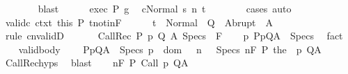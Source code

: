 \begin{isabellebody}
\ \ \ \ \ \ \isamarkupfalse%
\ blast\isanewline
\ \ \ \ \isamarkupfalse%
\ exec\ P\ g\ \isamarkupfalse%
\ {\isachardoublequoteopen}{\isasymGamma}{\isasymturnstile}{\isasymlangle}c{\isacharcomma}Normal\ s{\isasymrangle}\ {\isacharequal}n{\isasymRightarrow}\ t{\isachardoublequoteclose}\isanewline
\ \ \ \ \ \ \isamarkupfalse%
\ cases\ auto\isanewline
\ \ \ \ \isamarkupfalse%
\ valid{\isacharunderscore}c\ ctxt\ this\ P{\isacharprime}\ t{\isacharunderscore}notin{\isacharunderscore}F\isanewline
\ \ \ \ \isamarkupfalse%
\ {\isachardoublequoteopen}t\ {\isasymin}\ Normal\ {\isacharbackquote}\ Q\ {\isasymunion}\ Abrupt\ {\isacharbackquote}\ A{\isachardoublequoteclose}\isanewline
\ \ \ \ \ \ \isamarkupfalse%
\ {\isacharparenleft}rule\ cnvalidD{\isacharparenright}\isanewline
\ \ \isamarkupfalse%
\isanewline
{}\isamarkupfalse%
\isanewline
\ \ \isamarkupfalse%
\ {\isacharparenleft}CallRec\ P\ p\ Q\ A\ Specs\ {\isasymTheta}\ F{\isacharparenright}\isanewline
\ \ \isamarkupfalse%
\ p{\isacharcolon}\ {\isachardoublequoteopen}{\isacharparenleft}P{\isacharcomma}p{\isacharcomma}Q{\isacharcomma}A{\isacharparenright}\ {\isasymin}\ Specs{\isachardoublequoteclose}\ \isamarkupfalse%
\ fact\isanewline
\ \ \isamarkupfalse%
\ valid{\isacharunderscore}body{\isacharcolon}\isanewline
\ \ \ \ {\isachardoublequoteopen}{\isasymforall}{\isacharparenleft}P{\isacharcomma}p{\isacharcomma}Q{\isacharcomma}A{\isacharparenright}\ {\isasymin}\ Specs{\isachardot}\ p\ {\isasymin}\ dom\ {\isasymGamma}\ {\isasymand}\ {\isacharparenleft}{\isasymforall}n{\isachardot}\ {\isasymGamma}{\isacharcomma}{\isasymTheta}\ {\isasymunion}\ Specs\ {\isasymTurnstile}n{\isacharcolon}\isactrlbsub {\isacharslash}F\isactrlesub \ P\ {\isacharparenleft}the\ {\isacharparenleft}{\isasymGamma}\ p{\isacharparenright}{\isacharparenright}\ Q{\isacharcomma}A{\isacharparenright}{\isachardoublequoteclose}\isanewline
\ \ \ \ \isamarkupfalse%
\ CallRec{\isachardot}hyps\ \isamarkupfalse%
\ blast\isanewline
\ \ \isamarkupfalse%
\ {\isachardoublequoteopen}{\isasymGamma}{\isacharcomma}{\isasymTheta}{\isasymTurnstile}n{\isacharcolon}\isactrlbsub {\isacharslash}F\isactrlesub \ P\ Call\ p\ Q{\isacharcomma}A{\isachardoublequoteclose}\isanewline
\ \ \isamarkupfalse%
\ {\isacharminus}\isanewline
\ \ \ \ \isacommand{{\isacharbraceleft}}\isamarkupfalse%
\isanewline
\ \ \ \ \ \ \isamarkupfalse%

\end{isabellebody}
